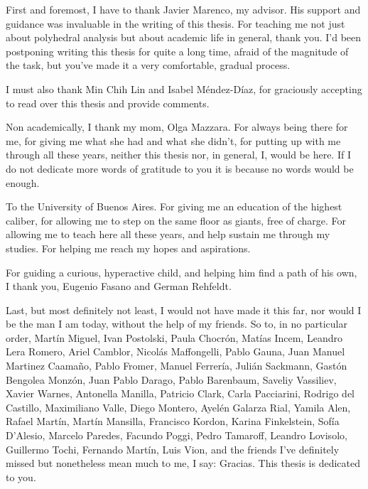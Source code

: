 First and foremost, I have to thank Javier Marenco, my advisor. His support and guidance was invaluable in the writing of this thesis. For teaching me not just about polyhedral analysis but about academic life in general, thank you. I'd been postponing writing this thesis for quite a long time, afraid of the magnitude of the task, but you've made it a very comfortable, gradual process.

I must also thank Min Chih Lin and Isabel Méndez-Díaz, for graciously accepting to read over this thesis and provide comments.

Non academically, I thank my mom, Olga Mazzara. For always being there for me, for giving me what she had and what she didn't, for putting up with me through all these years, neither this thesis nor, in general, I, would be here. If I do not dedicate more words of gratitude to you it is because no words would be enough.

To the University of Buenos Aires. For giving me an education of the highest caliber, for allowing me to step on the same floor as giants, free of charge. For allowing me to teach here all these years, and help sustain me through my studies. For helping me reach my hopes and aspirations.

For guiding a curious, hyperactive child, and helping him find a path of his own, I thank you, Eugenio Fasano and German Rehfeldt.

Last, but most definitely not least, I would not have made it this far, nor would I be the man I am today, without the help of my friends. So to, in no particular order, Martín Miguel, Ivan Postolski, Paula Chocrón, Matías Incem, Leandro Lera Romero, Ariel Camblor, Nicolás Maffongelli, Pablo Gauna, Juan Manuel Martinez Caamaño, Pablo Fromer, Manuel Ferrería, Julián Sackmann, Gastón Bengolea Monzón, Juan Pablo Darago, Pablo Barenbaum, Saveliy Vassiliev, Xavier Warnes, Antonella Manilla, Patricio Clark, Carla Pacciarini, Rodrigo del Castillo, Maximiliano Valle, Diego Montero, Ayelén Galarza Rial, Yamila Alen, Rafael Martín, Martín Mansilla, Francisco Kordon, Karina Finkelstein, Sofía D'Alesio, Marcelo Paredes, Facundo Poggi, Pedro Tamaroff, Leandro Lovisolo, Guillermo Tochi, Fernando Martín, Luis Vion, and the friends I've definitely missed but nonetheless mean much to me, I say: Gracias. This thesis is dedicated to you.
